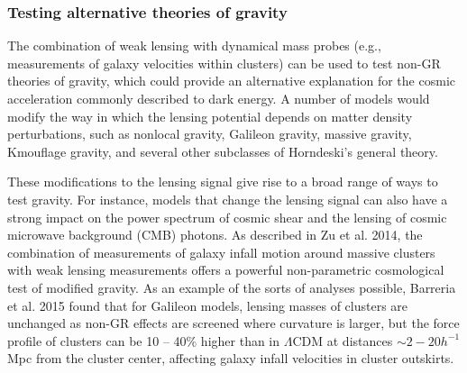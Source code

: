 \subsubsection{Testing alternative theories of gravity}

The combination of weak lensing with dynamical mass probes (e.g., measurements of galaxy velocities within clusters) can be used to test non-GR theories of gravity, which could provide an alternative explanation for the cosmic acceleration commonly described to dark energy.   A number of models would modify the way in which the lensing potential depends on matter density perturbations, such as nonlocal gravity, Galileon gravity, massive gravity, Kmouflage gravity, and several other subclasses of Horndeski's general theory.  

These modifications to the lensing signal give rise to a broad range of ways to test gravity.  For instance, models that change the lensing signal can also have a strong impact on the power spectrum of cosmic shear and the lensing of cosmic microwave background (CMB) photons.  
As described in Zu et al. 2014, the combination of measurements of galaxy
infall motion around massive clusters  with weak lensing measurements offers
a powerful non-parametric cosmological test of modified gravity.  As an example of the sorts of analyses possible, Barreria et al. 2015 found that for Galileon models, lensing masses of clusters are unchanged as non-GR effects are screened where curvature is larger, but the force profile of clusters can be 10 -- 40\% higher than in $\Lambda$CDM at distances $\sim 2-20 h^{-1}$ Mpc from the cluster center, affecting galaxy infall velocities in cluster outskirts.   

